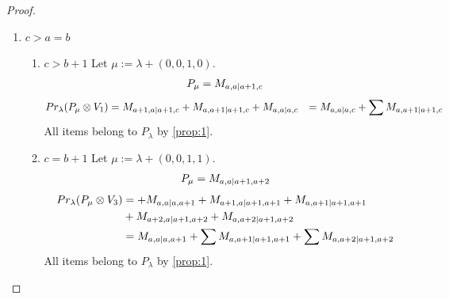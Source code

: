 \begin{proof}
\begin{enumerate}
\begin{enumerate}
    \item $a=b+1$
        Let $\mu:=\lambda + (1,1,0,0) $. 
\begin{equation}\notag
  \begin{aligned}
      P_{\mu} =
M_{b+2,b+1|b,c}
  \end{aligned}
\end{equation}
\begin{equation}\notag
  \begin{aligned}
  Pr_{\lambda}(P_\mu \otimes V_6) &=
M_{b+1,b|b,c}
+M_{b+1,b+1|b+1,c}
+M_{b+2,b+1|b+2,c}
  \end{aligned}
\end{equation}
All items belong to $P_\lambda$ by \cref{prop:1}.
  \end{enumerate}

\item $c>a=b$ 
  \begin{enumerate}
    \item $c>b+1$
        Let $\mu:=\lambda + (0,0,1,0) $. 
\begin{equation}\notag
  \begin{aligned}
      P_{\mu} =
M_{a,a|a+1,c}
  \end{aligned}
\end{equation}
\begin{equation}\notag
  \begin{aligned}
  Pr_{\lambda}(P_\mu \otimes V_1) &=
M_{a+1,a|a+1,c}
+M_{a,a+1|a+1,c}
+M_{a,a|a,c}
                                  &=
 M_{a,a|a,c}
+\sum M_{a,a+1|a+1,c}
  \end{aligned}
\end{equation}
All items belong to $P_\lambda$ by \cref{prop:1}.

    \item $c=b+1$
        Let $\mu:=\lambda + (0,0,1,1) $. 
\begin{equation}\notag
  \begin{aligned}
      P_{\mu} =
M_{a,a|a+1,a+2}
  \end{aligned}
\end{equation}
\begin{equation}\notag
  \begin{aligned}
  Pr_{\lambda}(P_\mu \otimes V_3) &=
+M_{a,a|a,a+1}
+M_{a+1,a|a+1,a+1}
+M_{a,a+1|a+1,a+1} \\
                                  &+
M_{a+2,a|a+1,a+2}
+M_{a,a+2|a+1,a+2} \\
                                  &=
M_{a,a|a,a+1}
+\sum M_{a,a+1|a+1,a+1}
+\sum M_{a,a+2|a+1,a+2}
  \end{aligned}
\end{equation}
All items belong to $P_\lambda$ by \cref{prop:1}.
  \end{enumerate}


\end{enumerate}
\end{proof}
